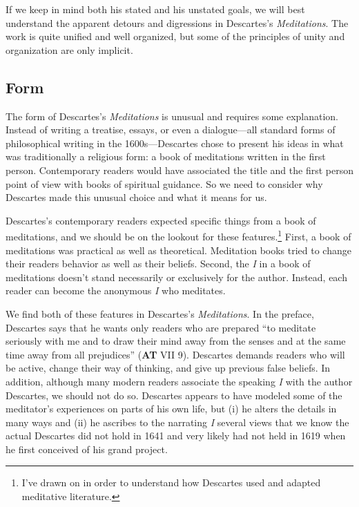 If we keep in mind both his stated and his unstated goals, we will best understand the apparent detours and digressions in Descartes's \textit{Meditations}. The work is quite unified and well organized, but some of the principles of unity and organization are only implicit.

\subsection*{Form}

The form of Descartes's \textit{Meditations} is unusual and requires some explanation. Instead of writing a treatise, essays, or even a dialogue---all standard forms of philosophical writing in the 1600s---Descartes chose to present his ideas in what was traditionally a religious form: a book of meditations written in the first person. Contemporary readers would have associated the title and the first person point of view with books of spiritual guidance. So we need to consider why Descartes made this unusual choice and what it means for us.

Descartes's contemporary readers expected specific things from a book of meditations, and we should be on the lookout for these features.\footnote{I've drawn on \textcites{rorty1986a}{williams1986}{mercer2014} in order to understand how Descartes used and adapted meditative literature.} First, a book of meditations was practical as well as theoretical. Meditation books tried to change their readers behavior as well as their beliefs. Second, the \textit{I} in a book of meditations doesn't stand necessarily or exclusively for the author. Instead, each reader can become the anonymous \textit{I} who meditates.

We find both of these features in Descartes's \textit{Meditations}. In the preface, Descartes says that he wants only readers who are prepared ``to meditate seriously with me and to draw their mind away from the senses and at the same time away from all prejudices'' (\textbf{AT} VII 9). Descartes demands readers who will be active, change their way of thinking, and give up previous false beliefs. In addition, although many modern readers associate the speaking \textit{I} with the author Descartes, we should not do so. Descartes appears to have modeled some of the meditator's experiences on parts of his own life, but (i) he alters the details in many ways and (ii) he ascribes to the narrating \textit{I} several views that we know the actual Descartes did not hold in 1641 and very likely had not held in 1619 when he first conceived of his grand project.

